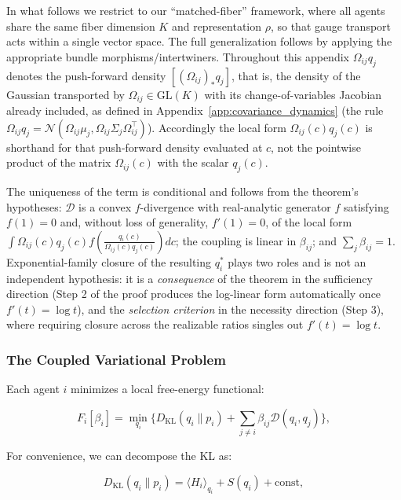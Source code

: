 \documentclass[twoside,11pt]{article}
\begin{document}
In what follows we restrict to our ``matched-fiber'' framework, where all agents share the same fiber dimension $K$ and representation $\rho$, so that gauge transport acts within a single vector space. The full generalization follows by applying the appropriate bundle morphisms/intertwiners. Throughout this appendix $\Omega_{ij} q_j$ denotes the push-forward density $[(\Omega_{ij})_* q_j]$, that is, the density of the Gaussian transported by $\Omega_{ij} \in \mathrm{GL}(K)$ with its change-of-variables Jacobian already included, as defined in Appendix~\ref{app:covariance_dynamics} (the rule $\Omega_{ij} q_j = \mathcal{N}(\Omega_{ij}\mu_j, \Omega_{ij}\Sigma_j\Omega_{ij}^\top)$). Accordingly the local form $\Omega_{ij}(c) q_j(c)$ is shorthand for that push-forward density evaluated at $c$, not the pointwise product of the matrix $\Omega_{ij}(c)$ with the scalar $q_j(c)$.

The uniqueness of the term is conditional and follows from the theorem's hypotheses: $\mathcal{D}$ is a convex $f$-divergence with real-analytic generator $f$ satisfying $f(1) = 0$ and, without loss of generality, $f'(1) = 0$, of the local form $\displaystyle \int \Omega_{ij}(c) q_j(c) f \left(\frac{q_i(c)}{\Omega_{ij}(c) q_j(c)}\right) dc$; the coupling is linear in $\beta_{ij}$; and $\sum_j \beta_{ij} = 1$. Exponential-family closure of the resulting $q_i^*$ plays two roles and is not an independent hypothesis: it is a \emph{consequence} of the theorem in the sufficiency direction (Step 2 of the proof produces the log-linear form automatically once $f'(t) = \log t$), and the \emph{selection criterion} in the necessity direction (Step 3), where requiring closure across the realizable ratios singles out $f'(t) = \log t$.

\subsubsection{The Coupled Variational Problem}

Each agent $i$ minimizes a local free-energy functional:

\begin{equation}
F_i[\beta_i]
=\min_{q_i}
\Big\{
D_{\mathrm{KL}}(q_i \| p_i)
+ \sum_{j\neq i} \beta_{ij} \mathcal{D}(q_i,q_j)
\Big\},
\label{eq:F_i_supp}
\end{equation}

For convenience, we can decompose the KL as:

\begin{equation}
D_{\mathrm{KL}}(q_i \| p_i) = \langle H_i \rangle_{q_i} + S(q_i) + \text{const},
\end{equation}
\end{document}
